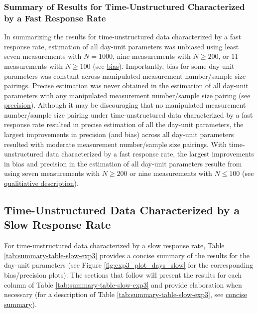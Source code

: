 \documentclass[
12pt, %
twoside,
english]{guelphthesis}
\begin{document}
\hypertarget{summary-of-results-for-time-unstructured-characterized-by-a-fast-response-rate}{%
\subsubsection{Summary of Results for Time-Unstructured Characterized by a Fast Response Rate}\label{summary-of-results-for-time-unstructured-characterized-by-a-fast-response-rate}}

In summarizing the results for time-unstructured data characterized by a fast response rate, estimation of all day-unit parameters was unbiased using least seven measurements with \(N = 1000\), nine measurements with \(N \ge 200\), or 11 measurements with \(N \ge 100\) (see \protect\hyperlink{bias-fast-exp3}{bias}). Importantly, bias for some day-unit parameters was constant across manipulated measurement number/sample size pairings. Precise estimation was never obtained in the estimation of all day-unit parameters with any manipulated measurement number/sample size pairing (see \protect\hyperlink{precision-fast-exp3}{precision}). Although it may be discouraging that no manipulated measurement number/sample size pairing under time-unstructured data characterized by a fast response rate resulted in precise estimation of all the day-unit parameters, the largest improvements in precision (and bias) across all day-unit parameters resulted with moderate measurement number/sample size pairings. With time-unstructured data characterized by a fast response rate, the largest improvements in bias and precision in the estimation of all day-unit parameters resulte from using seven measurements with \(N \ge 200\) or nine measurements with \(N \le 100\) (see \protect\hyperlink{qualitative-fast-exp3}{qualitiative description}).

\hypertarget{time-unstructured-data-characterized-by-a-slow-response-rate}{%
\subsection{Time-Unstructured Data Characterized by a Slow Response Rate}\label{time-unstructured-data-characterized-by-a-slow-response-rate}}

For time-unstructured data characterized by a slow response rate, Table \ref{tab:summary-table-slow-exp3} provides a concise summary of the results for the day-unit parameters (see Figure \ref{fig:exp3_plot_days_slow} for the corresponding bias/precision plots). The sections that follow will present the results for each column of Table \ref{tab:summary-table-slow-exp3} and provide elaboration when necessary (for a description of Table \ref{tab:summary-table-slow-exp3}, see \protect\hyperlink{concise-example-exp3}{concise summary}).
\end{document}
